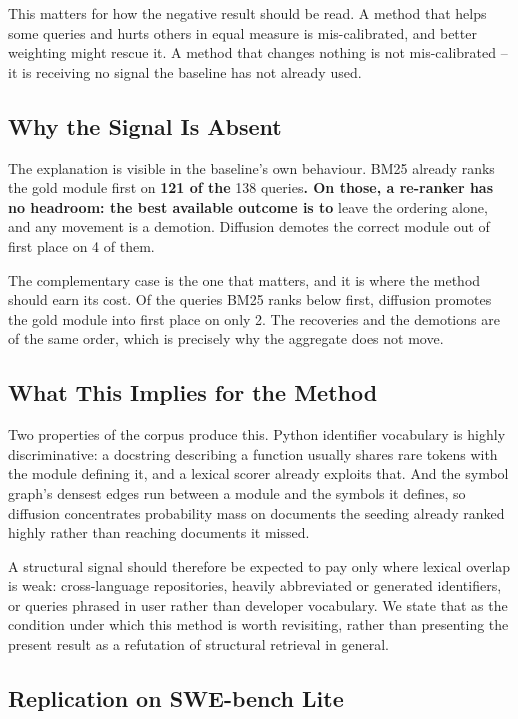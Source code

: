 \documentclass[10pt,journal,compsoc,twocolumn]{IEEEtran}
\begin{document}
This matters for how the negative result should be read. A method that helps some
queries and hurts others in equal measure is mis-calibrated, and better weighting
might rescue it. A method that changes nothing is not mis-calibrated -- it is
receiving no signal the baseline has not already used.


\subsection{Why the Signal Is Absent}


The explanation is visible in the baseline's own behaviour. BM25 already ranks the
gold module first on \textbf{121 of the}
138
queries\textbf{. On those, a re-ranker has no headroom: the best available outcome is to}
leave the ordering alone, and any movement is a demotion. Diffusion demotes the
correct module out of first place on 4 of
them.

The complementary case is the one that matters, and it is where the method should
earn its cost. Of the queries BM25 ranks below first, diffusion promotes the gold
module into first place on only 2. The
recoveries and the demotions are of the same order, which is precisely why the
aggregate does not move.


\subsection{What This Implies for the Method}


Two properties of the corpus produce this. Python identifier vocabulary is highly
discriminative: a docstring describing a function usually shares rare tokens with
the module defining it, and a lexical scorer already exploits that. And the symbol
graph's densest edges run between a module and the symbols it defines, so diffusion
concentrates probability mass on documents the seeding already ranked highly rather
than reaching documents it missed.

A structural signal should therefore be expected to pay only where lexical overlap
is weak: cross-language repositories, heavily abbreviated or generated identifiers,
or queries phrased in user rather than developer vocabulary. We state that as the
condition under which this method is worth revisiting, rather than presenting the
present result as a refutation of structural retrieval in general.



\subsection{Replication on SWE-bench Lite}
\end{document}
